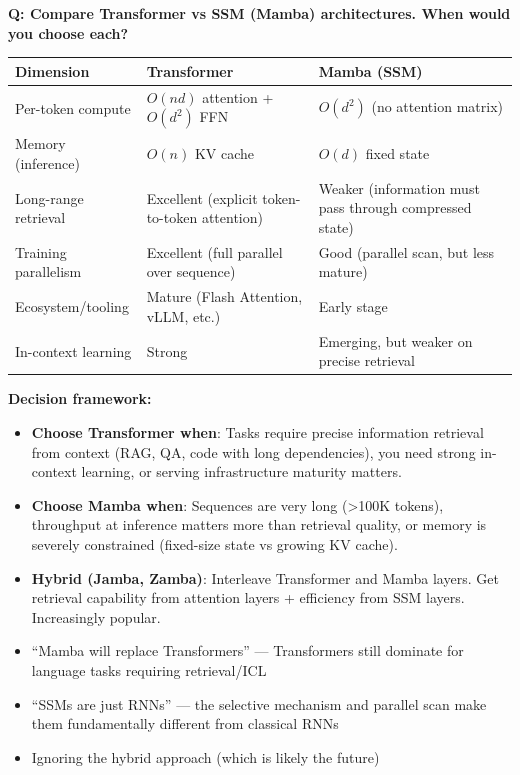 \begin{interviewq}
\textbf{Q: Compare Transformer vs SSM (Mamba) architectures. When would you choose each?}

 \quad {} \quad \badgefreq{\freqmed}

\stronganswer

\begin{table}[H]
\centering
\begin{tabularx}{\textwidth}{lXX}
\toprule
\textbf{Dimension} & \textbf{Transformer} & \textbf{Mamba (SSM)} \\
\midrule
Per-token compute & $O(nd)$ attention + $O(d^2)$ FFN & $O(d^2)$ (no attention matrix) \\
Memory (inference) & $O(n)$ KV cache & $O(d)$ fixed state \\
Long-range retrieval & Excellent (explicit token-to-token attention) & Weaker (information must pass through compressed state) \\
Training parallelism & Excellent (full parallel over sequence) & Good (parallel scan, but less mature) \\
Ecosystem/tooling & Mature (Flash Attention, vLLM, etc.) & Early stage \\
In-context learning & Strong & Emerging, but weaker on precise retrieval \\
\bottomrule
\end{tabularx}
\end{table}

\textbf{Decision framework:}
\begin{itemize}
    \item \textbf{Choose Transformer when}: Tasks require precise information retrieval from context (RAG, QA, code with long dependencies), you need strong in-context learning, or serving infrastructure maturity matters.
    \item \textbf{Choose Mamba when}: Sequences are very long (>100K tokens), throughput at inference matters more than retrieval quality, or memory is severely constrained (fixed-size state vs growing KV cache).
    \item \textbf{Hybrid (Jamba, Zamba)}: Interleave Transformer and Mamba layers. Get retrieval capability from attention layers + efficiency from SSM layers. Increasingly popular.
\end{itemize}

\redflags
\begin{itemize}
    \item ``Mamba will replace Transformers'' --- Transformers still dominate for language tasks requiring retrieval/ICL
    \item ``SSMs are just RNNs'' --- the selective mechanism and parallel scan make them fundamentally different from classical RNNs
    \item Ignoring the hybrid approach (which is likely the future)
\end{itemize}


\end{interviewq}
